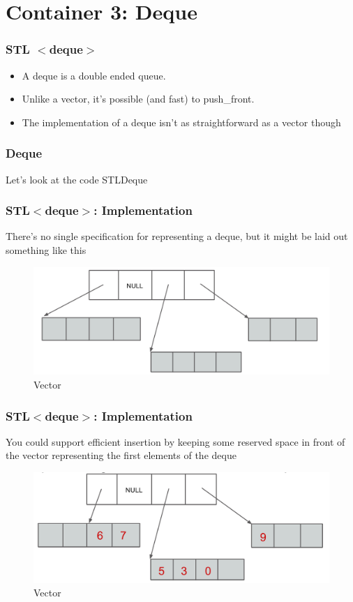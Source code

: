 \documentclass{beamer}
\newtheorem{Key points}{Key points}
\begin{document}
\section{Container 3: Deque}
\begin{frame}
  \frametitle{STL $<$deque$>$}
  \begin{itemize}
  \item A deque is a double
ended queue.
\item Unlike a vector, it's possible (and fast) to
push\_front.
\item  The implementation of a deque isn't as
straightforward as a vector though
  \end{itemize}
\end{frame}
\begin{frame}
  \frametitle{Deque}
  \begin{center}
   \Huge{Let's look at the code STLDeque}
  \end{center}
\end{frame}

\begin{frame}
  \frametitle{STL$<$deque$>$: Implementation}
There's no single specification for representing
a deque, but it might be laid out something like
this

\begin{figure}
  \centering
        \includegraphics[width=0.7\columnwidth]{deq1.png} 
  \caption{Vector }
\end{figure}
\end{frame}

\begin{frame}
  \frametitle{STL$<$deque$>$: Implementation}
You could support efficient insertion by keeping
some reserved space in front of the vector
representing the first elements of the deque
\begin{figure}
  \centering
        \includegraphics[width=0.7\columnwidth]{deq2.png} 
  \caption{Vector }
\end{figure}
\end{frame}
\end{document}
